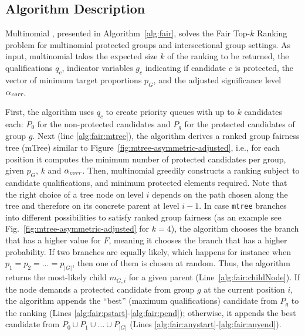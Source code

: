 \begin{algorithm}[h]
{{			\label{alg:fair:pend}
		}
		\label{alg:fair:anyend}

	}
	\Return{$\tau$}
\end{algorithm}

\subsection{Algorithm Description}\label{subsec:algorithm-description}
Multinomial \algoFAIR, presented in Algorithm~\ref{alg:fair}, solves the {\sc Fair Top-$k$ Ranking} problem for multinomial protected groups and intersectional group settings.
%
As input, multinomial \algoFAIR takes
the expected size $k$ of the ranking to be returned,
the qualifications $q_c$,
indicator variables $g_c$ indicating if candidate $c$ is protected,
the vector of minimum target proportions $p_G$, and
the adjusted significance level $\alpha_\textit{corr}$.

First, the algorithm uses $q_c$ to create priority queues with up to $k$ candidates each: $P_0$ for the non-protected candidates and $P_g$ for the protected candidates of group $g$.
%
Next (line \ref{alg:fair:mtree}), the algorithm derives a ranked group fairness tree (mTree) similar to Figure~\ref{fig:mtree-asymmetric-adjusted}, i.e., for each position it computes the minimum number of protected candidates per group, given $p_G$, $k$ and $\alpha_\textit{corr}$.
%
Then, multinomial \algoFAIR greedily constructs a ranking subject to candidate qualifications, and minimum protected elements required.
%
Note that the right choice of a tree node on level $i$ depends on the path chosen along the tree and therefore on its concrete parent at level $i-1$.
%
In case \texttt{mtree} branches into different possibilities to satisfy ranked group fairness (as an example see Fig.~\ref{fig:mtree-asymmetric-adjusted} for $k=4$), the algorithm chooses the branch that has a higher value for $F$, meaning it chooses the branch that has a higher probability.
%
If two branches are equally likely, which happens for instance when $p_1 = p_2 = \ldots = p_{|G|}$, then one of them is chosen at random.
%
Thus, the algorithm returns the most-likely child $m_{G,i}$ for a given parent (Line~\ref{alg:fair:childNode}).
%
If the node demands a protected candidate from group $g$ at the current position $i$, the algorithm appends the ``best'' (maximum qualifications) candidate from $P_g$ to the ranking (Lines \ref{alg:fair:pstart}-\ref{alg:fair:pend}); otherwise, it appends the best candidate from $P_0 \cup P_1 \cup \ldots \cup P_{|G|}$ (Lines \ref{alg:fair:anystart}-\ref{alg:fair:anyend}).
%

